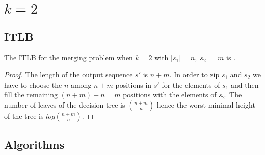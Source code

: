 \section{$k=2$}
\label{tree:merging:k=2}

\subsection{ITLB}
\label{tree:merging:k=2:ITLB}


\begin{theorem}
The ITLB for the merging problem when $k = 2$ with $|s_1| = n, |s_2| = m$ is .
\end{theorem}

\begin{proof}
The length of the output sequence $s'$ is $n+m$. In order to zip $s_1$ and $s_2$ we have to choose the $n$ among $n+m$ positions in $s'$ for the elements of $s_1$ and then fill the remaining $(n+m) - n = m$ positions with the elements of $s_2$. The number of leaves of the decision tree is $\binom{n+m}{n}$ hence the worst minimal height of the tree is $log \binom{n+m}{n}$.
\end{proof}


\subsection{Algorithms}
\label{tree:merging:k=2:alg}